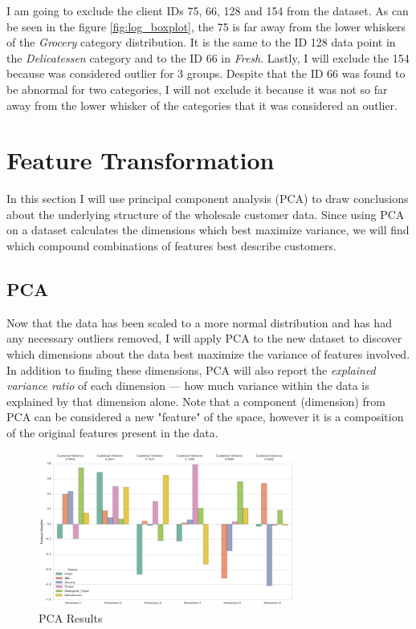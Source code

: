 \documentclass[a4paper]{article}
\begin{document}
I am going to exclude the client IDs 75, 66, 128 and 154 from the dataset. As can be seen in the figure \ref{fig:log_boxplot}, the 75 is far away from the lower whiskers of the \textit{Grocery} category distribution. It is the same to the ID 128 data point in the \textit{Delicatessen} category and to the ID 66 in \textit{Fresh}. Lastly, I will exclude the 154 because was considered outlier for 3 groups. Despite that the ID 66 was found to be abnormal for two categories, I will not exclude it because it was not so far away from the lower whisker of the categories that it was considered an outlier.


\section{Feature Transformation}
\label{sec:feature_transformation}
In this section I will use principal component analysis (PCA) to draw conclusions about the underlying structure of the wholesale customer data. Since using PCA on a dataset calculates the dimensions which best maximize variance, we will find which compound combinations of features best describe customers.

\subsection{PCA}

Now that the data has been scaled to a more normal distribution and has had any necessary outliers removed, I will apply PCA to the new dataset to discover which dimensions about the data best maximize the variance of features involved. In addition to finding these dimensions, PCA will also report the \textit{explained variance ratio} of each dimension — how much variance within the data is explained by that dimension alone. Note that a component (dimension) from PCA can be considered a new "feature" of the space, however it is a composition of the original features present in the data.

\begin{figure}[ht!]
\centering
\includegraphics[width=0.75\textwidth]{figures/pca_results.png}
\caption{\label{fig:pca_results}PCA Results}
\end{figure}
\end{document}
